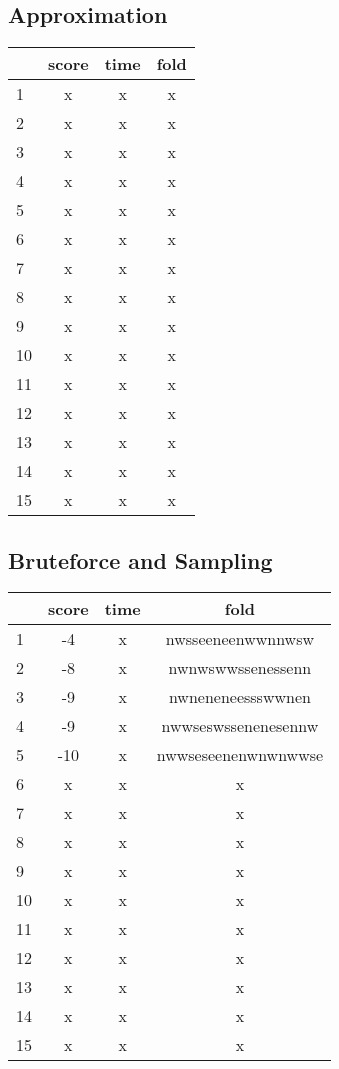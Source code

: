\documentclass[a4paper,oneside,article,11pt]{memoir}
\begin{document}
\subsection*{Approximation}
\begin{tabular}{l|c|c|c}
	& score	& time	& fold \\\hline
1	& x		& x		& x	\\\hline
2	& x		& x		& x	\\\hline
3	& x		& x		& x	\\\hline
4	& x		& x		& x	\\\hline
5	& x		& x		& x	\\\hline
6	& x		& x		& x	\\\hline
7	& x		& x		& x	\\\hline
8	& x		& x		& x	\\\hline
9	& x		& x		& x	\\\hline
10	& x		& x		& x	\\\hline
11	& x		& x		& x	\\\hline
12	& x		& x		& x	\\\hline
13	& x		& x		& x	\\\hline
14	& x		& x		& x	\\\hline
15	& x		& x		& x	\\
\end{tabular}

\subsection*{Bruteforce and Sampling}
\begin{tabular}{l|c|c|c}
	& score & time	& fold \\\hline
1	& -4	& x		& nwsseeneenwwnnwsw	\\\hline
2	& -8	& x		& nwnwswwssenessenn	\\\hline
3	& -9	& x		& nwneneneessswwnen	\\\hline
4	& -9	& x		& nwwseswssenenesennw \\\hline
5	& -10	& x		& nwwseseenenwnwnwwse \\\hline
6	& x		& x		& x	\\\hline
7	& x		& x		& x	\\\hline
8	& x		& x		& x	\\\hline
9	& x		& x		& x	\\\hline
10	& x		& x		& x	\\\hline
11	& x		& x		& x	\\\hline
12	& x		& x		& x	\\\hline
13	& x		& x		& x	\\\hline
14	& x		& x		& x	\\\hline
15	& x		& x		& x	\\
\end{tabular}
\end{document}
